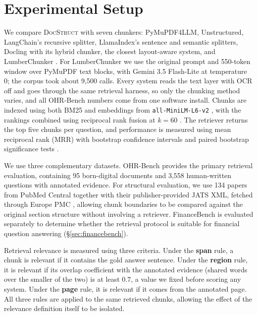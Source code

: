 \documentclass[11pt]{article}
\newcommand{\ds}{\textsc{DocStruct}}
\begin{document}
\section{Experimental Setup}
\label{sec:setup}

We compare \ds{} with seven chunkers: PyMuPDF4LLM, Unstructured, LangChain's recursive splitter, LlamaIndex's sentence and semantic splitters, Docling \citep{auer2024docling} with its hybrid chunker, the closest layout-aware system, and LumberChunker \citep{duarte2024lumberchunker}. For LumberChunker we use the original prompt and 550-token window over PyMuPDF text blocks, with Gemini 3.5 Flash-Lite at temperature 0; the corpus took about 9{,}500 calls. Every system reads the text layer with OCR off and goes through the same retrieval harness, so only the chunking method varies, and all OHR-Bench numbers come from one software install. Chunks are indexed using both BM25 \citep{robertson2009bm25} and embeddings from \texttt{all-MiniLM-L6-v2} \citep{reimers2019sbert}, with the rankings combined using reciprocal rank fusion at $k{=}60$ \citep{cormack2009rrf}. The retriever returns the top five chunks per question, and performance is measured using mean reciprocal rank (MRR) with bootstrap confidence intervals and paired bootstrap significance tests \citep{efron1993bootstrap}.

We use three complementary datasets. OHR-Bench \citep{zhang2025ocrhindersrag} provides the primary retrieval evaluation, containing 95 born-digital documents and 3{,}558 human-written questions with annotated evidence. For structural evaluation, we use 134 papers from PubMed Central together with their publisher-provided JATS XML, fetched through Europe PMC \citep{europepmc}, allowing chunk boundaries to be compared against the original section structure without involving a retriever. FinanceBench \citep{islam2023financebench} is evaluated separately to determine whether the retrieval protocol is suitable for financial question answering (\S\ref{sec:financebench}).

Retrieval relevance is measured using three criteria. Under the \textbf{span} rule, a chunk is relevant if it contains the gold answer sentence. Under the \textbf{region} rule, it is relevant if its overlap coefficient with the annotated evidence (shared words over the smaller of the two) is at least $0.7$, a value we fixed before scoring any system. Under the \textbf{page} rule, it is relevant if it comes from the annotated page. All three rules are applied to the same retrieved chunks, allowing the effect of the relevance definition itself to be isolated.
\end{document}
